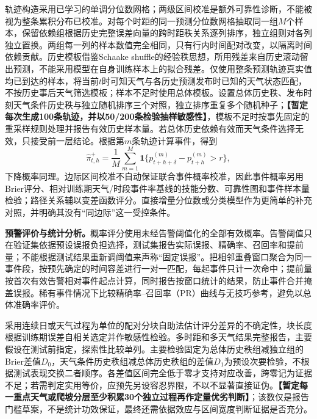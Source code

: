 轨迹构造采用已学习的单调分位数网格；两级区间校准是额外可靠性诊断，不能被视为整条累积分布已校准。对每个时距的同一预测分位数网格抽取同一组$M$个样本，保留依赖组根据历史完整误差向量的跨时距秩关系逐列排序，独立组则对各列独立置换。两组每一列的样本数值完全相同，只有行内时间配对改变，以隔离时间依赖贡献。历史模板借鉴Schaake shuffle的经验秩思想\cite{clark2004schaake,schefzik2013ecc}，所用残差来自历史滚动留出预测，不能采用模型在自身训练样本上的拟合残差。仅使用整条预测轨迹真实值均已到达的样本，将当前$t$时可知天气与各历史预测发布时已知的天气状态匹配，不按历史事后天气筛选模板；样本不足时使用总体模板。设置总体历史秩、发布时刻天气条件历史秩与独立随机排序三个对照，独立排序重复多个随机种子；\textbf{【暂定每次生成100条轨迹，并以50/200条检验抽样敏感性】}，模板不足时按事先固定的重采样规则处理并报告有效历史样本量。若总体历史依赖有效而天气条件选择无效，只接受前一层结论。根据第$m$条轨迹计算事件，得到
\[
\widehat\pi^+_{t,h}=\frac{1}{M}\sum_{m=1}^{M}
\mathbf{1}\{p^{(m)}_{t+h+\delta}-p^{(m)}_{t+h}>r\},
\]
下降概率同理。边际区间校准不自动保证联合事件概率校准，因此事件概率另用Brier评分、相对训练期天气/时段事件率基线的技能分数、可靠性图和事件样本量检验；路径关系辅以变差函数评分\cite{scheuerer2015variogram}。直接增量分位数或分类模型作为更简单的补充对照，并明确其没有“同边际”这一受控条件。

\textbf{预警评价与统计分析。}概率评分使用未经告警阈值化的全部有效概率。告警阈值只在验证集依据预设误报负担选择，测试集报告实际误报、精确率、召回率和提前量；不能根据测试结果重新调阈值来声称“固定误报”。把相邻重叠窗口聚合为同一事件段，按预先确定的时间容差进行一对一匹配，每起事件只计一次命中；提前量按首次有效告警相对事件起点计算，同时报告按窗口统计的结果，防止事件合并掩盖误报。稀有事件情况下比较精确率--召回率（PR）曲线与无技巧参考，避免以总体准确率评价。

采用连续日或天气过程为单位的配对分块自助法估计评分差异的不确定性，块长度根据训练期误差自相关选定并作敏感性检验。多时距和多天气结果完整报告，主要假设在测试前指定，探索性比较单列。主要检验固定为总体历史秩组减独立组的Brier差值$D_0$，天气条件历史秩组减总体历史秩组的差值$D_1$为预设次要检验，不根据测试表现交换二者顺序。各差值区间完全低于零才支持对应改善，跨零记为证据不足；若需判定实用等价，应预先另设容忍界限，不以不显著直接证伪。\textbf{【暂定每一重点天气或爬坡分层至少积累30个独立过程再作定量优劣判断】}；该数仅是报告门槛草案，不是统计功效保证，最终还需依据效应与区间宽度判断证据是否充分。

